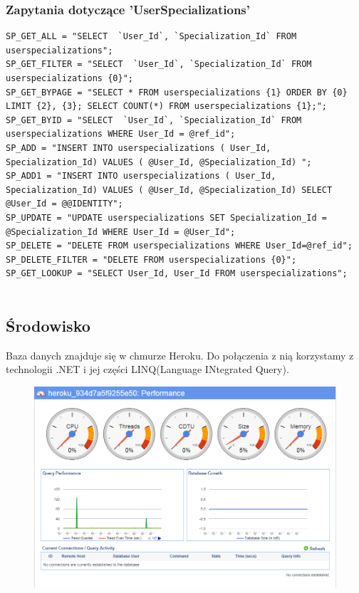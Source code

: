 \documentclass[12pt,a4paper]{article}
\begin{document}
			\subsubsection{Zapytania dotyczące 'UserSpecializations'}
			\begin{lstlisting}
SP_GET_ALL = "SELECT  `User_Id`, `Specialization_Id` FROM userspecializations";
SP_GET_FILTER = "SELECT  `User_Id`, `Specialization_Id` FROM userspecializations {0}";
SP_GET_BYPAGE = "SELECT * FROM userspecializations {1} ORDER BY {0} LIMIT {2}, {3}; SELECT COUNT(*) FROM userspecializations {1};";
SP_GET_BYID = "SELECT  `User_Id`, `Specialization_Id` FROM userspecializations WHERE User_Id = @ref_id";
SP_ADD = "INSERT INTO userspecializations ( User_Id, Specialization_Id) VALUES ( @User_Id, @Specialization_Id) ";
SP_ADD1 = "INSERT INTO userspecializations ( User_Id, Specialization_Id) VALUES ( @User_Id, @Specialization_Id) SELECT @User_Id = @@IDENTITY";
SP_UPDATE = "UPDATE userspecializations SET Specialization_Id = @Specialization_Id WHERE User_Id = @User_Id";
SP_DELETE = "DELETE FROM userspecializations WHERE User_Id=@ref_id";
SP_DELETE_FILTER = "DELETE FROM userspecializations {0}";
SP_GET_LOOKUP = "SELECT User_Id, User_Id FROM userspecializations";
			
			\end{lstlisting}
		\subsection{Środowisko}
			Baza danych znajduje się w chmurze Heroku. Do połączenia z nią korzystamy z technologii .NET i jej części LINQ(Language INtegrated Query).
\begin{figure}[H]
\centering
\includegraphics[width=1\textwidth]{heroku_info}
\end{figure}
\end{document}
